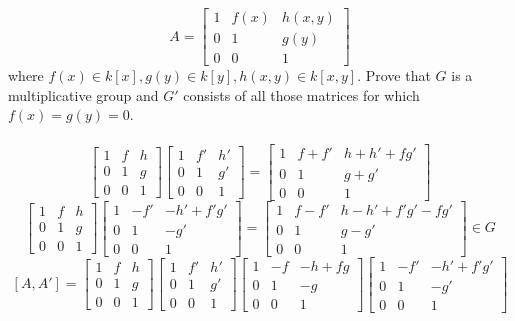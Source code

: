 \documentclass{article}
\begin{document}
\begin{siderules}
\[A=\begin{bmatrix}1&f(x)&h(x,y)\\0&1&g(y)\\0&0&1\end{bmatrix}\] where \(f(x)\in k[x],g(y)\in k[y],h(x,y)\in k[x,y]\). Prove that \(G\) is a multiplicative group and \(G'\) consists of all those matrices for which \(f(x)=g(y)=0\).\color{black}\\\\
\[\begin{bmatrix}1&f&h\\0&1&g\\0&0&1\end{bmatrix}\begin{bmatrix}1&f'&h'\\0&1&g'\\0&0&1\end{bmatrix}=\begin{bmatrix}1&f+f'&h+h'+fg'\\0&1&g+g'\\0&0&1\end{bmatrix}\]
\[\begin{bmatrix}1&f&h\\0&1&g\\0&0&1\end{bmatrix}\begin{bmatrix}1&-f'&-h'+f'g'\\0&1&-g'\\0&0&1\end{bmatrix}=\begin{bmatrix}1&f-f'&h-h'+f'g'-fg'\\0&1&g-g'\\0&0&1\end{bmatrix}\in G\]
\[[A,A']=\begin{bmatrix}1&f&h\\0&1&g\\0&0&1\end{bmatrix}\begin{bmatrix}1&f'&h'\\0&1&g'\\0&0&1\end{bmatrix}\begin{bmatrix}1&-f&-h+fg\\0&1&-g\\0&0&1\end{bmatrix}\begin{bmatrix}1&-f'&-h'+f'g'\\0&1&-g'\\0&0&1\end{bmatrix}\]

\end{siderules}
\end{document}
